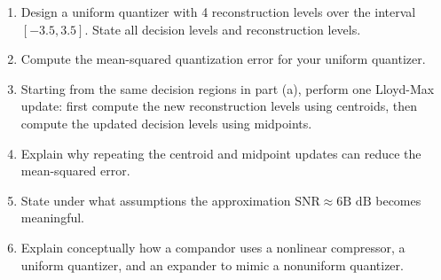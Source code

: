 \begin{enumerate}
    \item[\textbf{(a)}] Design a uniform quantizer with 4 reconstruction levels over the interval $[-3.5, 3.5]$. State all decision levels and reconstruction levels.
    \item[\textbf{(b)}] Compute the mean-squared quantization error for your uniform quantizer.
    \item[\textbf{(c)}] Starting from the same decision regions in part (a), perform one Lloyd-Max update: first compute the new reconstruction levels using centroids, then compute the updated decision levels using midpoints.
    \item[\textbf{(d)}] Explain why repeating the centroid and midpoint updates can reduce the mean-squared error.
    \item[\textbf{(e)}] State under what assumptions the approximation $\text{SNR} \approx 6\text{B dB}$ becomes meaningful.
    \item[\textbf{(f)}] Explain conceptually how a compandor uses a nonlinear compressor, a uniform quantizer, and an expander to mimic a nonuniform quantizer.
\end{enumerate}

\RTL